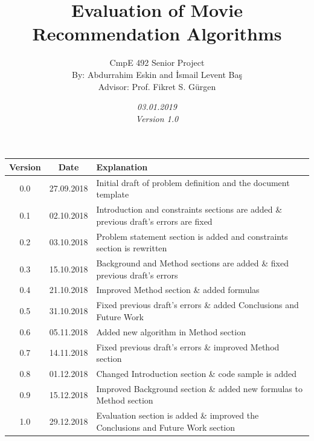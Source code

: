 \documentclass[12pt,a4paper]{report}
\title{Evaluation of Movie Recommendation Algorithms}
\date{\emph{03.01.2019} \\ \emph{Version 1.0} }
\author{CmpE 492 Senior Project\\
By: Abdurrahim Eskin and İsmail Levent Baş \\
Advisor: Prof. Fikret S. Gürgen \\
}
\begin{document}

\maketitle

\begin{history}

\begin{table}[htp]
\begin{center}
\begin{tabular}{|c|c|p{10cm}|}
\hline
\textbf{Version} & \textbf{Date} & \textbf{Explanation} \\
\hline
0.0 & 27.09.2018 & Initial draft of problem definition and the document template \\
\hline
0.1 & 02.10.2018 & Introduction and constraints sections are added \& previous draft's errors are fixed \\
\hline
0.2 & 03.10.2018 & Problem statement section is added and constraints section is rewritten \\
\hline
0.3 & 15.10.2018 & Background and Method sections are added \& fixed previous draft's errors \\
\hline
0.4 & 21.10.2018 & Improved Method section \& added formulas \\ \hline
0.5 & 31.10.2018 & Fixed previous draft's errors \& added Conclusions and Future Work  \\
\hline
0.6 & 05.11.2018 & Added new algorithm in Method section  \\
\hline
0.7 & 14.11.2018 & Fixed previous draft's errors \& improved Method section \\
\hline
0.8 & 01.12.2018 & Changed Introduction section \& code sample is added \\
\hline
0.9 & 15.12.2018 & Improved Background section \& added new formulas to Method section  \\
\hline
1.0 & 29.12.2018 & Evaluation section is added \& improved the Conclusions and Future Work section \\
\hline
\end{tabular}
\end{center}
\end{table}


\end{history}
\end{document}

